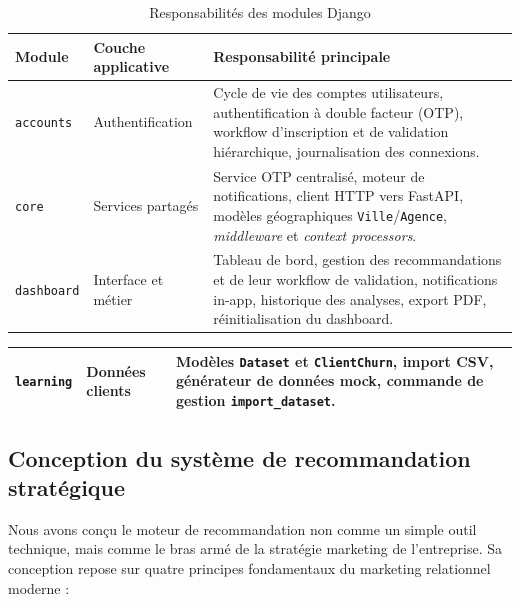 \begin{enumerate}
\begin{table}[htbp]
    \centering
    \caption{Responsabilités des modules Django}
    \label{tab:modules_django}
    \begin{tabular}{|p{2.8cm}|p{4cm}|p{6.5cm}|}
        \hline
        \textbf{Module} & \textbf{Couche applicative}
        & \textbf{Responsabilité principale} \\
        \hline
        \texttt{accounts}
        & Authentification
        & Cycle de vie des comptes utilisateurs, authentification à
          double facteur (OTP), workflow d'inscription et de
          validation hiérarchique, journalisation des connexions. \\
        \hline
        \texttt{core}
        & Services partagés
        & Service OTP centralisé, moteur de notifications, client HTTP vers FastAPI,
          modèles géographiques \texttt{Ville}/\texttt{Agence},
          \textit{middleware} et \textit{context processors}. \\
        \hline
        \texttt{dashboard}
        & Interface et métier
        & Tableau de bord, gestion des recommandations et de leur
          workflow de validation, notifications in-app, historique
          des analyses, export PDF, réinitialisation du dashboard. \\
        \hline
    \end{tabular}
\end{table}
\begin{table}[htbp]
    \centering
    \begin{tabular}{|p{2.8cm}|p{4cm}|p{6.5cm}|}
        \hline
        \texttt{learning}
        & Données clients
        & Modèles \texttt{Dataset} et \texttt{ClientChurn}, import
          CSV, générateur de données mock, commande de gestion
          \texttt{import\_dataset}. \\
        \hline
    \end{tabular}
\end{table}
\end{enumerate}

\subsection{Conception du système de recommandation stratégique}

Nous avons conçu le moteur de recommandation non comme un simple outil technique, mais comme le bras armé de la stratégie marketing de l'entreprise. Sa conception repose sur quatre principes fondamentaux du marketing relationnel moderne :


